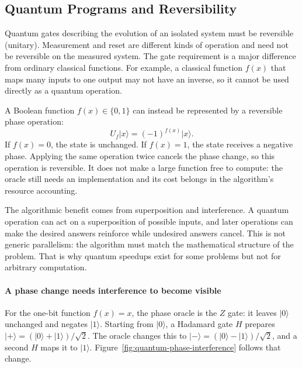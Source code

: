 \subsection{Quantum Programs and Reversibility}\label{subsec:appd-quantum-programs}
Quantum gates describing the evolution of an isolated system must be reversible (unitary).
Measurement and reset are different kinds of operation and need not be reversible on the measured system.
The gate requirement is a major difference from ordinary classical functions.
For example, a classical function $f(x)$ that maps many inputs to one output may not have an inverse, so it cannot be used directly as a quantum operation.

A Boolean function $f(x)\in\{0,1\}$ can instead be represented by a reversible phase operation:
\begin{equation}\label{eq:appd-phase-oracle}
    U_f\lvert x\rangle = (-1)^{f(x)}\lvert x\rangle.
\end{equation}
If $f(x)=0$, the state is unchanged.
If $f(x)=1$, the state receives a negative phase.
Applying the same operation twice cancels the phase change, so this operation is reversible.
It does not make a large function free to compute: the oracle still needs an implementation and its cost belongs in the algorithm's resource accounting.

The algorithmic benefit comes from superposition and interference.
A quantum operation can act on a superposition of possible inputs, and later operations can make the desired answers reinforce while undesired answers cancel.
This is not generic parallelism: the algorithm must match the mathematical structure of the problem.
That is why quantum speedups exist for some problems but not for arbitrary computation.

\paragraph{A phase change needs interference to become visible}
For the one-bit function $f(x)=x$, the phase oracle is the $Z$ gate: it leaves $\lvert0\rangle$ unchanged and negates $\lvert1\rangle$.
Starting from $\lvert0\rangle$, a Hadamard gate $H$ prepares $\lvert+\rangle=(\lvert0\rangle+\lvert1\rangle)/\sqrt2$.
The oracle changes this to $\lvert-\rangle=(\lvert0\rangle-\lvert1\rangle)/\sqrt2$, and a second $H$ maps it to $\lvert1\rangle$.
Figure~\ref{fig:quantum-phase-interference} follows that change.



